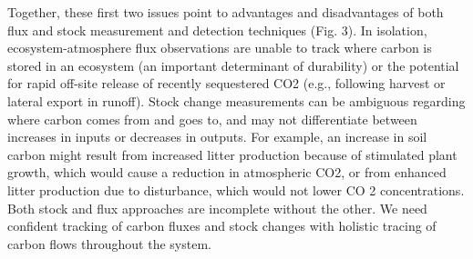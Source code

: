 \documentclass[
  letterpaper,
  DIV=11,
  numbers=noendperiod]{scrreprt}
\begin{document}
Together, these first two issues point to advantages and disadvantages
of both flux and stock measurement and detection techniques (Fig. 3). In
isolation, ecosystem-atmosphere flux observations are unable to track
where carbon is stored in an ecosystem (an important determinant of
durability) or the potential for rapid off-site release of recently
sequestered CO2 (e.g., following harvest or lateral export in runoff).
Stock change measurements can be ambiguous regarding where carbon comes
from and goes to, and may not differentiate between increases in inputs
or decreases in outputs. For example, an increase in soil carbon might
result from increased litter production because of stimulated plant
growth, which would cause a reduction in atmospheric CO2, or from
enhanced litter production due to disturbance, which would not lower CO
2 concentrations. Both stock and flux approaches are incomplete without
the other. We need confident tracking of carbon fluxes and stock changes
with holistic tracing of carbon flows throughout the system.
\end{document}
